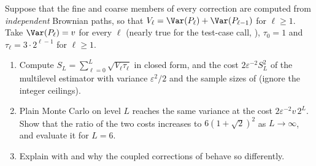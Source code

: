 
\begin{exercise}\label{ex:ml-uncoupled}
\easy Suppose that the fine and coarse members of every correction are computed from
\emph{independent} Brownian paths, so that $V_\ell=\Var(P_\ell)+\Var(P_{\ell-1})$ for $\ell\ge1$.
Take $\Var(P_\ell)=v$ for every $\ell$ (nearly true for the test-case call, ),
$\tau_0=1$ and $\tau_\ell=3\cdot2^{\ell-1}$ for $\ell\ge1$.
\begin{enumerate}[label=(\alph*)]
  \item Compute $S_L=\sum_{\ell=0}^L\sqrt{V_\ell\tau_\ell}$ in closed form, and the cost
    $2\varepsilon^{-2}S_L^2$ of the multilevel estimator with variance $\varepsilon^2/2$ and the
    sample sizes of  (ignore the integer ceilings).
  \item Plain Monte Carlo on level $L$ reaches the same variance at the cost
    $2\varepsilon^{-2}v\,2^L$. Show that the ratio of the two costs increases to $6(1+\sqrt2)^2$ as
    $L\to\infty$, and evaluate it for $L=6$.
  \item Explain with  and  why the coupled corrections
    of  behave so differently.
\end{enumerate}
\end{exercise}

